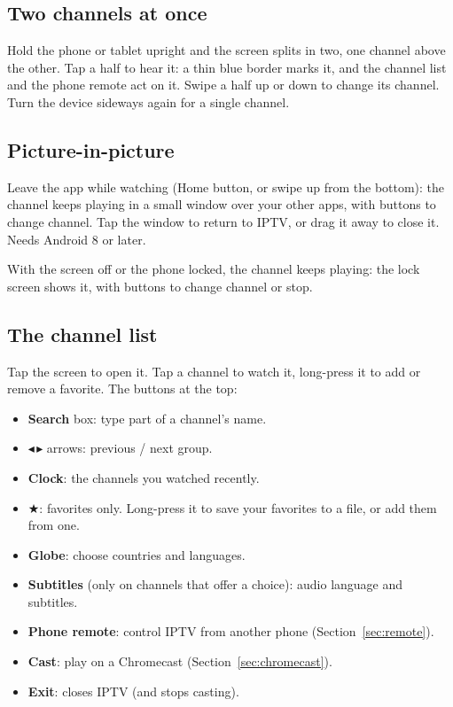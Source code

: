 \subsection{Two channels at once}
Hold the phone or tablet upright and the screen splits in two, one channel
above the other. Tap a half to hear it: a thin blue border marks it, and the
channel list and the phone remote act on it. Swipe a half up or down to
change its channel. Turn the device sideways again for a single channel.

\subsection{Picture-in-picture}
Leave the app while watching (Home button, or swipe up from the bottom): the
channel keeps playing in a small window over your other apps, with buttons to
change channel. Tap the window to return to IPTV, or drag it away to close
it. Needs Android 8 or later.

With the screen off or the phone locked, the channel keeps playing: the lock
screen shows it, with buttons to change channel or stop.

\subsection{The channel list}
Tap the screen to open it. Tap a channel to watch it, long-press it to add
or remove a favorite. The buttons at the top:
\begin{itemize}
  \item \textbf{Search} box: type part of a channel's name.
  \item $\blacktriangleleft$\,$\blacktriangleright$ arrows: previous / next group.
  \item \textbf{Clock}: the channels you watched recently.
  \item $\bigstar$: favorites only. Long-press it to save your favorites to a
        file, or add them from one.
  \item \textbf{Globe}: choose countries and languages.
  \item \textbf{Subtitles} (only on channels that offer a choice): audio
        language and subtitles.
  \item \textbf{Phone remote}: control IPTV from another phone
        (Section~\ref{sec:remote}).
  \item \textbf{Cast}: play on a Chromecast (Section~\ref{sec:chromecast}).
  \item \textbf{Exit}: closes IPTV (and stops casting).
\end{itemize}


